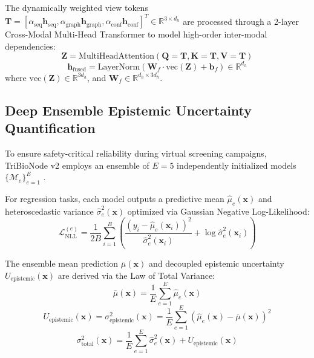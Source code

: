 \documentclass[10pt,twocolumn]{article}
\begin{document}
The dynamically weighted view tokens $\mathbf{T} = [\alpha_{\text{seq}}\mathbf{h}_{\text{seq}}, \alpha_{\text{graph}}\mathbf{h}_{\text{graph}}, \alpha_{\text{conf}}\mathbf{h}_{\text{conf}}]^T \in \mathbb{R}^{3 \times d_h}$ are processed through a 2-layer Cross-Modal Multi-Head Transformer to model high-order inter-modal dependencies:
\begin{equation}
\mathbf{Z} = \text{MultiHeadAttention}(\mathbf{Q}=\mathbf{T}, \mathbf{K}=\mathbf{T}, \mathbf{V}=\mathbf{T})
\end{equation}
\begin{equation}
\mathbf{h}_{\text{fused}} = \text{LayerNorm}\left(\mathbf{W}_f \cdot \text{vec}(\mathbf{Z}) + \mathbf{b}_f\right) \in \mathbb{R}^{d_h}
\label{eq:fused_rep}
\end{equation}
where $\text{vec}(\mathbf{Z}) \in \mathbb{R}^{3d_h}$, and $\mathbf{W}_f \in \mathbb{R}^{d_h \times 3d_h}$.

\subsection{Deep Ensemble Epistemic Uncertainty Quantification}

To ensure safety-critical reliability during virtual screening campaigns, TriBioNode v2 employs an ensemble of $E = 5$ independently initialized models $\{\mathcal{M}_e\}_{e=1}^E$ \cite{lakshminarayanan2017simple, kendall2017uncertainties, soleimany2021image, hirschfeld2020uncertainty}.

For regression tasks, each model outputs a predictive mean $\widehat{\mu}_e(\mathbf{x})$ and heteroscedastic variance $\widehat{\sigma}_e^2(\mathbf{x})$ optimized via Gaussian Negative Log-Likelihood:
\begin{equation}
\mathcal{L}_{\text{NLL}}^{(e)} = \frac{1}{2B} \sum_{i=1}^B \left(\frac{(y_i - \widehat{\mu}_e(\mathbf{x}_i))^2}{\widehat{\sigma}_e^2(\mathbf{x}_i)} + \log \widehat{\sigma}_e^2(\mathbf{x}_i)\right)
\label{eq:nll_loss}
\end{equation}

The ensemble mean prediction $\overline{\mu}(\mathbf{x})$ and decoupled epistemic uncertainty $U_{\text{epistemic}}(\mathbf{x})$ are derived via the Law of Total Variance:
\begin{equation}
\overline{\mu}(\mathbf{x}) = \frac{1}{E} \sum_{e=1}^E \widehat{\mu}_e(\mathbf{x})
\end{equation}
\begin{equation}
U_{\text{epistemic}}(\mathbf{x}) = \sigma_{\text{epistemic}}^2(\mathbf{x}) = \frac{1}{E} \sum_{e=1}^E \left(\widehat{\mu}_e(\mathbf{x}) - \overline{\mu}(\mathbf{x})\right)^2
\label{eq:epistemic_var}
\end{equation}
\begin{equation}
\sigma_{\text{total}}^2(\mathbf{x}) = \frac{1}{E}\sum_{e=1}^E \widehat{\sigma}_e^2(\mathbf{x}) + U_{\text{epistemic}}(\mathbf{x})
\end{equation}
\end{document}

